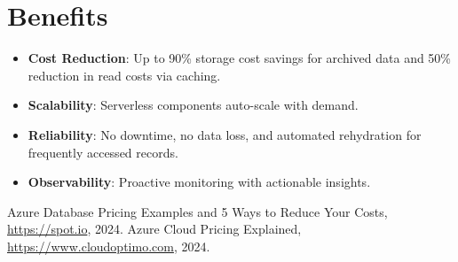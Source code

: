 \documentclass[a4paper]{article}
\begin{document}
\section*{Benefits}
\begin{itemize}
    \item \textbf{Cost Reduction}: Up to 90\% storage cost savings for archived data and 50\% reduction in read costs via caching.
    \item \textbf{Scalability}: Serverless components auto-scale with demand.
    \item \textbf{Reliability}: No downtime, no data loss, and automated rehydration for frequently accessed records.
    \item \textbf{Observability}: Proactive monitoring with actionable insights.
\end{itemize}



\begin{thebibliography}{99}
 Azure Database Pricing Examples and 5 Ways to Reduce Your Costs, \url{https://spot.io}, 2024.
 Azure Cloud Pricing Explained, \url{https://www.cloudoptimo.com}, 2024.
\end{thebibliography}
\end{document}
